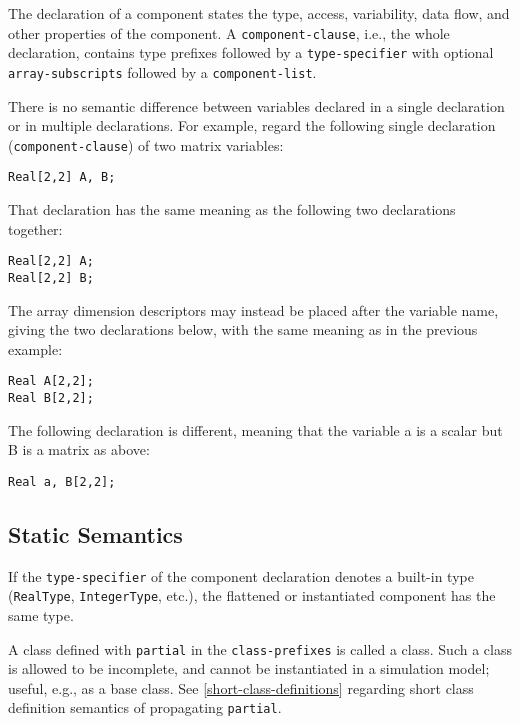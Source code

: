 \begin{nonnormative}
The declaration of a component states the type, access, variability, data flow, and other properties of the component.
A \lstinline[language=grammar]!component-clause!, i.e., the whole declaration, contains type prefixes followed by a \lstinline[language=grammar]!type-specifier! with optional \lstinline[language=grammar]!array-subscripts! followed by a \lstinline[language=grammar]!component-list!.

There is no semantic difference between variables declared in a single declaration or in multiple declarations.
For example, regard the following single declaration (\lstinline[language=grammar]!component-clause!) of two matrix variables:
\begin{lstlisting}[language=modelica]
Real[2,2] A, B;
\end{lstlisting}
That declaration has the same meaning as the following two declarations together:
\begin{lstlisting}[language=modelica]
Real[2,2] A;
Real[2,2] B;
\end{lstlisting}
The array dimension descriptors may instead be placed after the variable name, giving the two declarations below, with the same meaning as in the previous example:
\begin{lstlisting}[language=modelica]
Real A[2,2];
Real B[2,2];
\end{lstlisting}
The following declaration is different, meaning that the variable a is a scalar but B is a matrix as above:
\begin{lstlisting}[language=modelica]
Real a, B[2,2];
\end{lstlisting}
\end{nonnormative}

\subsection{Static Semantics}\label{component-declaration-static-semantics}

If the \lstinline[language=grammar]!type-specifier! of the component declaration denotes a built-in type (\lstinline!RealType!, \lstinline!IntegerType!, etc.), the flattened or instantiated component has the same type.

A class defined with \lstinline!partial! in the \lstinline[language=grammar]!class-prefixes! is called a  class.
Such a class is allowed to be incomplete, and cannot be instantiated in a simulation model; useful, e.g., as a base class.
See \cref{short-class-definitions} regarding short class definition semantics of propagating \lstinline!partial!.

